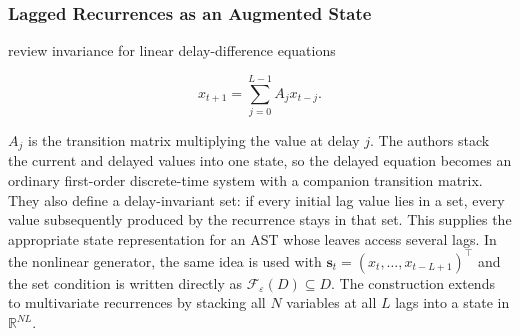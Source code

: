 \subsubsection{Lagged Recurrences as an Augmented State}

\citet{laraba2016setinvariance} review invariance for linear delay-difference
equations

\begin{equation}
    x_{t+1}=\sum_{j=0}^{L-1}A_jx_{t-j}.
\end{equation}

$A_j$ is the transition matrix multiplying the value at delay $j$. The authors
stack the current and delayed values into one state, so the delayed
equation becomes an ordinary first-order discrete-time system with a companion
transition matrix. They also define a delay-invariant set: if every initial lag
value lies in a set, every value subsequently produced by the recurrence stays
in that set. This supplies the appropriate state representation for an AST
whose leaves access several lags. In the nonlinear generator, the same idea is
used with $\mathbf{s}_t=(x_t,\ldots,x_{t-L+1})^\top$ and the set condition is
written directly as $\mathcal F_{\varepsilon}(D)\subseteq D$. The construction
extends to multivariate recurrences by stacking all $N$ variables at all $L$
lags into a state in $\mathbb R^{NL}$.
